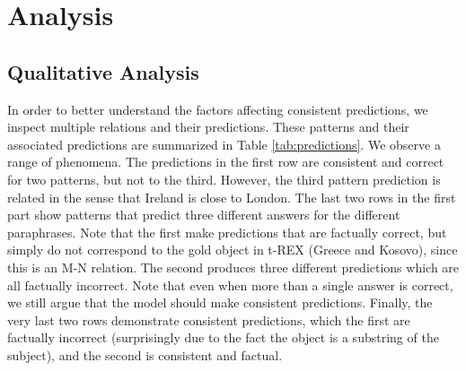 \section{Analysis}
\label{sec:analysis}










\subsection{Qualitative Analysis}
In order to better understand the factors affecting consistent predictions, we inspect multiple relations and their predictions. These patterns and their associated predictions are summarized in Table \ref{tab:predictions}.
We observe a range of phenomena. The predictions in the first row are consistent and correct for two patterns, but not to the third. However, the third pattern prediction is related in the sense that Ireland is close to London.
The last two rows in the first part show patterns that predict three different answers for the different paraphrases. Note that the first make predictions that are factually correct, but simply do not correspond to the gold object in t-REX (Greece and Kosovo), since this is an M-N relation. The second produces three different predictions which are all factually incorrect. Note that even when more than a single answer is correct, we still argue that the model should make consistent predictions.
Finally, the very last two rows demonstrate consistent predictions, which the first are factually incorrect (surprisingly due to the fact the object is a substring of the subject), and the second is consistent and factual.





